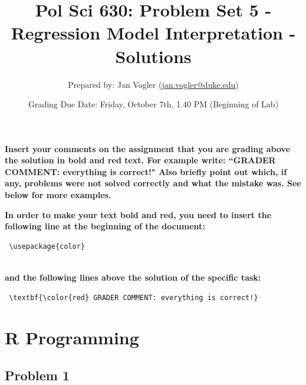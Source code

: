 \documentclass[12pt]{article}\usepackage[]{graphicx}\usepackage[]{color}
\begin{document}
\title{Pol Sci 630: Problem Set 5 - Regression Model Interpretation - Solutions}

\author{Prepared by: Jan Vogler (\href{mailto:jan.vogler@duke.edu}{jan.vogler@duke.edu})}

\date{Grading Due Date: Friday, October 7th, 1.40 PM (Beginning of Lab)}
 
\maketitle



\textbf{\color{red} Insert your comments on the assignment that you are grading above the solution in bold and red text. For example write: ``GRADER COMMENT: everything is correct!" Also briefly point out which, if any, problems were not solved correctly and what the mistake was. See below for more examples.}

\bigskip

\textbf{In order to make your text bold and red, you need to insert the following line at the beginning of the document:}

\begin{verbatim} \usepackage{color} \end{verbatim}

\\ \textbf{and the following lines above the solution of the specific task:}

\begin{verbatim} \textbf{\color{red} GRADER COMMENT: everything is correct!} \end{verbatim}



\pagebreak

\section*{R Programming}

\subsection*{Problem 1}
\end{document}
